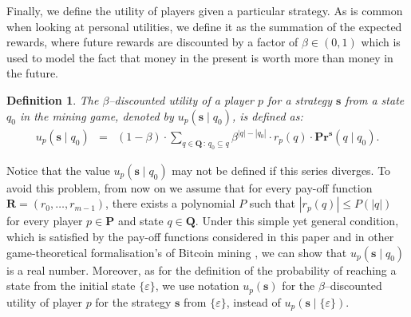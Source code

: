 \documentclass[a4paper,english,cleveref, autoref,numberwithinsect]{lipics-v2019}
\newtheorem{mydef}[mythm]{Definition}
\newcommand{\pr}{\mathbf{Pr}}
\newcommand{\bs}{\mathbf{s}}
\newcommand{\bP}{\mathbf{P}}
\newcommand{\bR}{\mathbf{R}}
\newcommand{\bS}{\mathbf{S}}
\newcommand{\bQ}{\mathbf{Q}}
\begin{document}
Finally, we define the utility of players given a particular strategy. 
As is common
when looking at personal utilities, we define it as the summation of the expected rewards, 
where future rewards are discounted by a factor of $\beta \in (0,1)$ which is used to model the fact that money in the present is worth more than money in the future. 
%
\begin{mydef}
\label{def-utility}
The $\beta$--discounted utility of a player $p$ for a strategy $\bs$ from a state $q_0$ in
the mining game, denoted by $u_p(\bs \mid q_0)$, is defined as:
\begin{eqnarray*}
u_p(\bs \mid q_0) & = & (1 - \beta) \cdot \sum_{q \in \bQ \,:\, q_0 \subseteq q} \beta^{|q|-|q_0|} \cdot r_p(q) \cdot \pr^{\bs}(q \mid q_0).
\end{eqnarray*}
\end{mydef}
Notice that the value $u_p(\bs \mid q_0)$ may not be defined if this series %
diverges. To avoid this problem, from now on we assume that for every pay-off function $\bR = (r_0, \ldots, r_{m-1})$, there exists a polynomial $P$ such that $|r_p(q)| \leq P(|q|)$ for every player $p \in \bP$ and state $q \in \bQ$. Under this simple yet general condition, which is satisfied by the pay-off functions considered in this paper and in other game-theoretical formalisation's of Bitcoin mining \cite{mininggames:2016}, we can show that $u_p(\bs \mid q_0)$ is a real number. Moreover, as for the definition of the probability of reaching a state from the initial state $\{\varepsilon\}$, we use notation $u_p(\bs)$ for the $\beta$--discounted utility of player $p$ for the strategy $\bs$ from $\{\varepsilon\}$, instead of $u_p(\bs \mid \{\varepsilon\})$. 

\end{document}
